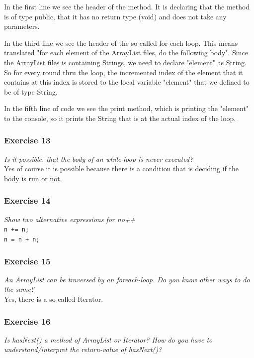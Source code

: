 In the first line we see the header of the method. It is declaring that the
method is of type public, that it has no return type (void) and does not 
take any parameters.

In the third line we see the header of the so called for-each loop. This
means translated "for each element of the ArrayList files, do the following
body". Since the ArrayList files is containing Strings, we need to declare
"element" as String. So for every round thru the loop, the incremented index
of the element that it contains at this index is stored to the local variable
"element" that we defined to be of type String.

In the fifth line of code we see the print method, which is printing the
"element" to the console, so it prints the String that is at the actual
index of the loop.

\subsubsection*{Exercise 13}
\textit{Is it possible, that the body of an while-loop is never executed?}\\

Yes of course it is possible because there is a condition that is deciding
if the body is run or not.

\subsubsection*{Exercise 14}
\textit{Show two alternative expressions for no++}\\

\lstinline{n += n;}\\

\lstinline{n = n + n;}

\subsubsection*{Exercise 15}
\textit{An ArrayList can be traversed by an foreach-loop. Do you know other
ways to do the same?}\\

Yes, there is a so called Iterator.

\subsubsection*{Exercise 16}
\textit{Is hasNext() a method of ArrayList or Iterator? How do you have to 
understand/interpret the return-value of hasNext()?}\\

